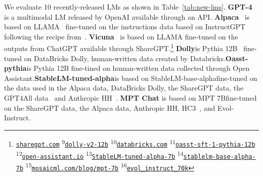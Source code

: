 \documentclass[11pt]{article}
\begin{document}
We evaluate 10 recently-released LMs as shown in Table~\ref{tab:new-lms}.
\textbf{GPT-4}~\citep{OpenAI2023GPT4TR} is a multimodal LM released by OpenAI available through an API.
\textbf{Alpaca}~\citep{alpaca} is based on LLAMA~\citep{touvron2023llama} fine-tuned on the instructions data based on InstructGPT following the recipe from~\citet{wang2022super}.
\textbf{Vicuna}~\citep{vicuna2023} is based on LLAMA fine-tuned on the outputs from ChatGPT available through ShareGPT.\footnote{
\href{https://sharegpt.com/}{\texttt{sharegpt.com}}
\textsuperscript{9}\href{https://huggingface.co/databricks/dolly-v2-12b}{\texttt{dolly-v2-12b}}
\textsuperscript{10}\href{https://www.databricks.com}{\texttt{databricks.com}}
\textsuperscript{11}\href{https://huggingface.co/OpenAssistant/oasst-sft-1-pythia-12b}{\texttt{oasst-sft-1-pythia-12b}}
\textsuperscript{12}\href{https://open-assistant.io/}{\texttt{open-assistant.io}}
\textsuperscript{13}\href{https://huggingface.co/stabilityai/stablelm-tuned-alpha-7b}{\texttt{StableLM-tuned-alpha-7b}}
\textsuperscript{14}\href{https://huggingface.co/stabilityai/stablelm-base-alpha-7b}{\texttt{stablelm-base-alpha-7b}}
\textsuperscript{15}\href{https://www.mosaicml.com/blog/mpt-7b}{\texttt{mosaicml.com/blog/mpt-7b}}
\textsuperscript{16}\href{https://huggingface.co/datasets/victor123/evol_instruct_70k}{\texttt{evol\_instruct\_70k}}}
\textbf{Dolly}\footnotemark[9] is Pythia 12B~\citep{biderman2023pythia} fine-tuned on DataBricks Dolly, human-written data created by Databricks.\footnotemark[10]
\textbf{Oasst-pythia}\footnotemark[11] is Pythia 12B fine-tined on human-written data collected through Open Assistant.\footnotemark[12]
\textbf{StableLM-tuned-alpha}\footnotemark[13] is based on StableLM-base-alpha\footnotemark[14] fine-tuned on the data used in the Alpaca data, DataBricks Dolly, the ShareGPT data, the GPT4All data~\citep{gpt4all} and Anthropic HH~\citep{bai2022training}.
\textbf{MPT Chat} is based on MPT 7B\footnotemark[15] fine-tuned on the ShareGPT data, the Alpaca data, Anthropic HH, HC3~\citep{guo-etal-2023-hc3}, and Evol-Instruct.\footnotemark[16]

\setcounter{footnote}{16} 
\end{document}
